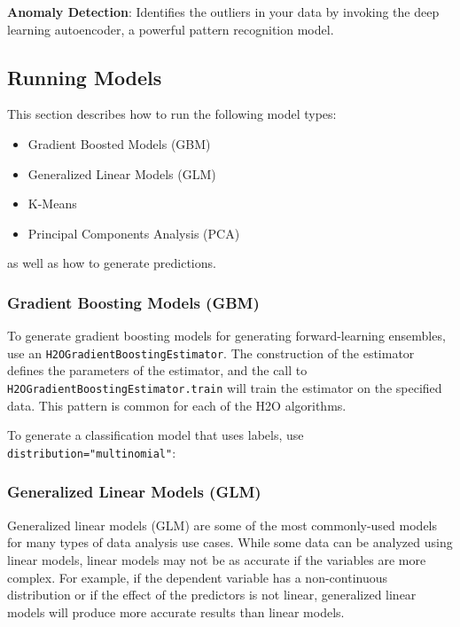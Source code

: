 {\textbf{Anomaly Detection}}: Identifies the outliers in your data by invoking the deep learning autoencoder, a powerful pattern recognition model.

\subsection{Running Models}
This section describes how to run the following model types:

\begin{itemize}
\item Gradient Boosted Models (GBM)
\item Generalized Linear Models (GLM)
\item K-Means
\item Principal Components Analysis (PCA)

\end{itemize}
as well as how to generate predictions.

\subsubsection{Gradient Boosting Models (GBM)}
To generate gradient boosting models for generating forward-learning ensembles,
use an {\texttt{H2OGradientBoostingEstimator}}.  The construction of the estimator
defines the parameters of the estimator, and the call to
{\texttt{H2OGradientBoostingEstimator.train}} will train the estimator on
the specified data.  This pattern is common for each of the H2O algorithms.



To generate a classification model that uses labels, use
{\texttt{distribution="multinomial"}}:



\subsubsection{Generalized Linear Models (GLM)}
Generalized linear models (GLM) are some of the most commonly-used
models for many types of data analysis use cases. While some data
can be analyzed using linear models, linear models
may not be as accurate if the variables are more complex.
For example, if the dependent variable has a non-continuous
distribution or if the effect of the predictors is not linear,
generalized linear models will produce more accurate results than linear models.

